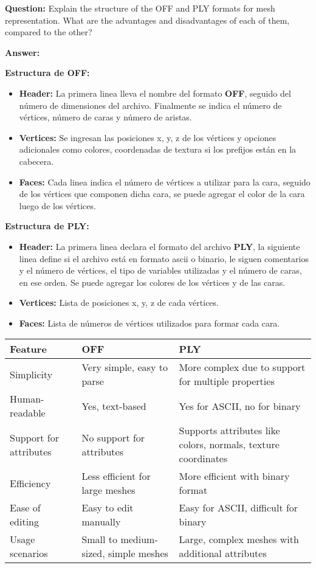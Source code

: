 \documentclass{article}
\begin{document}
\textbf{Question:} Explain the structure of the OFF and PLY formats for mesh representation. What are the advantages and disadvantages of each of them, compared to the other?

\textbf{Answer:}

\textbf{Estructura de OFF:}

\begin{itemize}
    \item \textbf{Header:} La primera linea lleva el nombre del formato \textbf{OFF}, seguido del número de dimensiones del archivo. Finalmente se indica el número de vértices, número de caras y número de aristas.
    \item \textbf{Vertices:} Se ingresan las posiciones x, y, z de los vértices y opciones adicionales como colores, coordenadas de textura si los prefijos están en la cabecera.
    \item \textbf{Faces:} Cada linea indica el número de vértices a utilizar para la cara, seguido de los vértices que componen dicha cara, se puede agregar el color de la cara luego de los vértices.
\end{itemize}

\textbf{Estructura de PLY:}

\begin{itemize}
    \item \textbf{Header:} La primera linea declara el formato del archivo \textbf{PLY}, la siguiente linea define si el archivo está en formato ascii o binario, le siguen comentarios y el número de vértices, el tipo de variables utilizadas y el número de caras, en ese orden. Se puede agregar los colores de los vértices y de las caras.
    \item \textbf{Vertices:} Lista de posiciones x, y, z de cada vértices.
    \item \textbf{Faces:} Lista de números de vértices utilizados para formar cada cara.
\end{itemize}

\begin{table}[h!]
    \centering
    \begin{tabular}{|l|l|l|}
        \hline
        Feature & OFF & PLY \\
        \hline
        Simplicity & Very simple, easy to parse & More complex due to support for multiple properties \\
        \hline
        Human-readable & Yes, text-based & Yes for ASCII, no for binary \\
        \hline
        Support for attributes & No support for attributes & Supports attributes like colors, normals, texture coordinates \\
        \hline
        Efficiency & Less efficient for large meshes & More efficient with binary format \\
        \hline
        Ease of editing & Easy to edit manually & Easy for ASCII, difficult for binary \\
        \hline
        Usage scenarios & Small to medium-sized, simple meshes & Large, complex meshes with additional attributes \\
        \hline
    \end{tabular}
\end{table}
\end{document}

